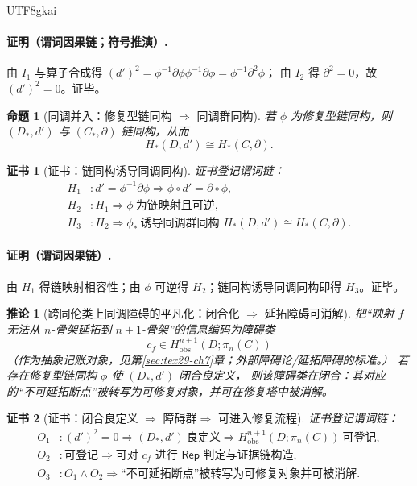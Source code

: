 \documentclass[12pt]{article}
\newtheorem{proposition}{命题}[section]
\newtheorem{corollary}{推论}[section]
\newtheorem{Certificate}{证书}[section]
\newcommand{\KouJing}{\texorpdfstring{表述约定}{表述约定}}
\begin{document}
\begin{CJK*}{UTF8}{gkai}
\paragraph{证明（谓词因果链；符号推演）.}
由 $I_1$ 与算子合成得 $(d')^2=\phi^{-1}\partial\phi\phi^{-1}\partial\phi=\phi^{-1}\partial^2\phi$；
由 $I_2$ 得 $\partial^2=0$，故 $(d')^2=0$。证毕。

\begin{proposition}[同调并入：修复型链同构 $\Rightarrow$ 同调群同构]
\label{prop:tex29-ch16-homology-embed}
若 $\phi$ 为修复型链同构，则 $(D_*,d')$ 与 $(C_*,\partial)$ 链同构，从而
\[
  H_*(D,d')\cong H_*(C,\partial).
\]
\end{proposition}

\begin{Certificate}[证书：链同构诱导同调同构]
\label{cert:tex29-ch16-homology-embed}
证书登记谓词链：
\[
\begin{aligned}
  H_1 &: d'=\phi^{-1}\partial\phi\Rightarrow \phi\circ d'=\partial\circ \phi,\\
  H_2 &: H_1\Rightarrow \phi\ \text{为链映射且可逆},\\
  H_3 &: H_2\Rightarrow \phi_*\ \text{诱导同调群同构 }H_*(D,d')\cong H_*(C,\partial).
\end{aligned}
\]
\end{Certificate}

\paragraph{证明（谓词因果链）.}
由 $H_1$ 得链映射相容性；由 $\phi$ 可逆得 $H_2$；链同构诱导同调同构即得 $H_3$。证毕。

\begin{corollary}[跨同伦类上同调障碍的平凡化：闭合化 $\Rightarrow$ 延拓障碍可消解]
\label{cor:tex29-ch16-obstruction-trivialized}
把“映射 $f$ 无法从 $n$-骨架延拓到 $n{+}1$-骨架”的信息编码为障碍类
\[
  c_f\in H^{n+1}_{\mathrm{obs}}(D;\pi_n(C))
\]
（作为抽象记账对象，见第\ref{sec:tex29-ch7}章；外部障碍论/延拓障碍的标准 \cite{Whitehead1978Elements,Switzer1975HomotopyHomology}。）
若存在修复型链同构 $\phi$ 使 $(D_*,d')$ 闭合良定义，
则该障碍类在闭合：其对应的“不可延拓断点”被转写为可修复对象，并可在修复塔中被消解。
\end{corollary}

\begin{Certificate}[证书：闭合良定义 $\Rightarrow$ 障碍群 $\Rightarrow$ 可进入修复流程]
\label{cert:tex29-ch16-obstruction-trivialized}
证书登记谓词链：
\[
\begin{aligned}
  O_1 &: (d')^2=0\Rightarrow (D_*,d')\ \text{良定义}\Rightarrow H^{n+1}_{\mathrm{obs}}(D;\pi_n(C))\ \text{可登记},\\
  O_2 &: \text{可登记}\Rightarrow \text{可对 }c_f\text{ 进行 }\mathsf{Rep}\text{ 判定与证据链构造},\\
  O_3 &: O_1\wedge O_2\Rightarrow \text{“不可延拓断点”被转写为可修复对象并可被消解}.
\end{aligned}
\]
\end{Certificate}


\end{CJK*}
\end{document}
